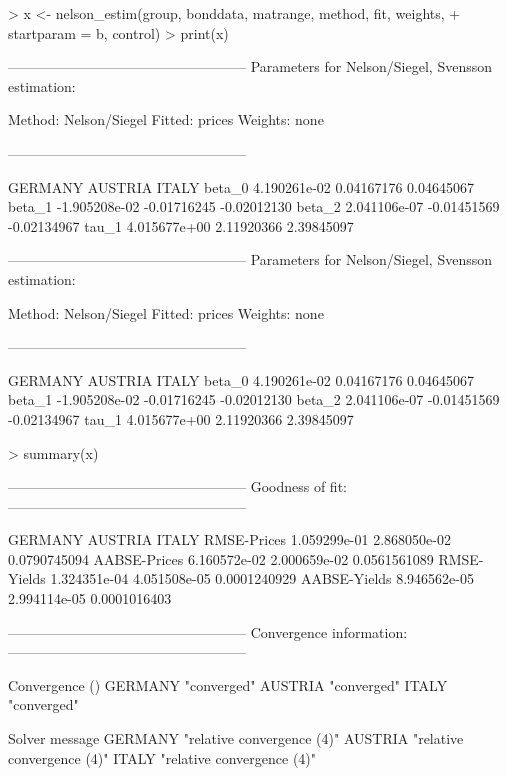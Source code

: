 \begin{Schunk}
\begin{Sinput}
> x <- nelson_estim(group, bonddata, matrange, method, fit, weights, 
+     startparam = b, control)
> print(x)
\end{Sinput}
\begin{Soutput}
---------------------------------------------------
Parameters for Nelson/Siegel, Svensson estimation:

Method: Nelson/Siegel 
Fitted: prices 
Weights: none 

---------------------------------------------------

             GERMANY     AUSTRIA       ITALY
beta_0  4.190261e-02  0.04167176  0.04645067
beta_1 -1.905208e-02 -0.01716245 -0.02012130
beta_2  2.041106e-07 -0.01451569 -0.02134967
tau_1   4.015677e+00  2.11920366  2.39845097

---------------------------------------------------
Parameters for Nelson/Siegel, Svensson estimation:

Method: Nelson/Siegel 
Fitted: prices 
Weights: none 

---------------------------------------------------

             GERMANY     AUSTRIA       ITALY
beta_0  4.190261e-02  0.04167176  0.04645067
beta_1 -1.905208e-02 -0.01716245 -0.02012130
beta_2  2.041106e-07 -0.01451569 -0.02134967
tau_1   4.015677e+00  2.11920366  2.39845097
\end{Soutput}
\end{Schunk}

\begin{Schunk}
\begin{Sinput}
> summary(x)
\end{Sinput}
\begin{Soutput}
---------------------------------------------------
Goodness of fit:
---------------------------------------------------

                  GERMANY      AUSTRIA        ITALY
RMSE-Prices  1.059299e-01 2.868050e-02 0.0790745094
AABSE-Prices 6.160572e-02 2.000659e-02 0.0561561089
RMSE-Yields  1.324351e-04 4.051508e-05 0.0001240929
AABSE-Yields 8.946562e-05 2.994114e-05 0.0001016403


---------------------------------------------------
Convergence information:
---------------------------------------------------

        Convergence ()
GERMANY "converged"   
AUSTRIA "converged"   
ITALY   "converged"   

        Solver message            
GERMANY "relative convergence (4)"
AUSTRIA "relative convergence (4)"
ITALY   "relative convergence (4)"
\end{Soutput}
\end{Schunk}

